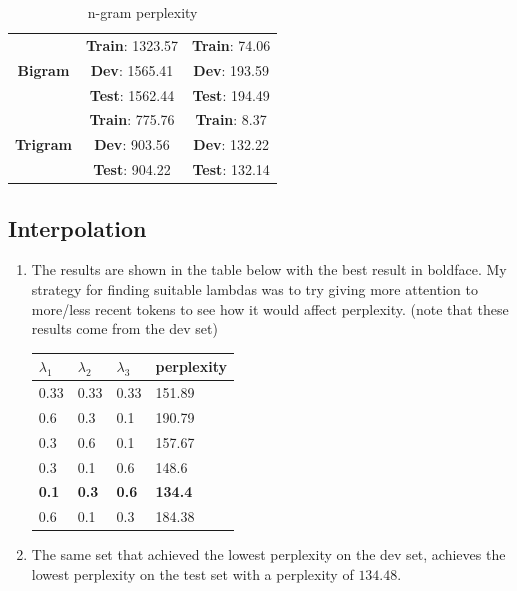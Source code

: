 \documentclass[12pt]{article}
\begin{document}
\begin{center}
\begin{enumerate}[label=(\alph*)]
\begin{table}[H]
\begin{tabular}{|c|c|c|}
					& \textbf{Train}: 1323.57  & \textbf{Train}: 74.06\\
					\textbf{Bigram} & \textbf{Dev}: 1565.41 & \textbf{Dev}: 193.59 \\
					& \textbf{Test}: 1562.44 & \textbf{Test}: 194.49 \\
					\hline
					
					& \textbf{Train}: 775.76 & \textbf{Train}: 8.37 \\
					\textbf{Trigram} & \textbf{Dev}: 903.56 & \textbf{Dev}: 132.22 \\
					& \textbf{Test}: 904.22 & \textbf{Test}: 132.14 \\
					\hline
				\end{tabular}
				\caption{n-gram perplexity}
			\end{table}
		
		\newpage
				\subsection{Interpolation}
				\begin{enumerate}
				\item The results are shown in the table below with the best result in boldface. My strategy for finding suitable lambdas was to try giving more attention to more/less recent tokens to see how it would affect perplexity. (note that these results come from the dev set)
			\begin{table}[H]
				\centering
				\begin{tabular}{|l|l|l|l|}
					\hline
					$\lambda_1$ & $\lambda_2$ & $\lambda_3$ & \textbf{perplexity} \\ \hline
					0.33 & 0.33 & 0.33 & 151.89 \\ \hline
					0.6 & 0.3 & 0.1 & 190.79 \\ \hline
					0.3 & 0.6 & 0.1 & 157.67 \\ \hline
					0.3 & 0.1 & 0.6 & 148.6 \\ \hline
					\textbf{0.1} & \textbf{0.3} & \textbf{0.6} & \textbf{134.4} \\ \hline
					0.6 & 0.1 & 0.3 & 184.38 \\ \hline
				\end{tabular}
			\end{table}
		\item The same set that achieved the lowest perplexity on the dev set, achieves the lowest perplexity on the test set with a perplexity of $134.48$.
		

\end{enumerate}
\end{enumerate}
\end{center}
\end{document}
